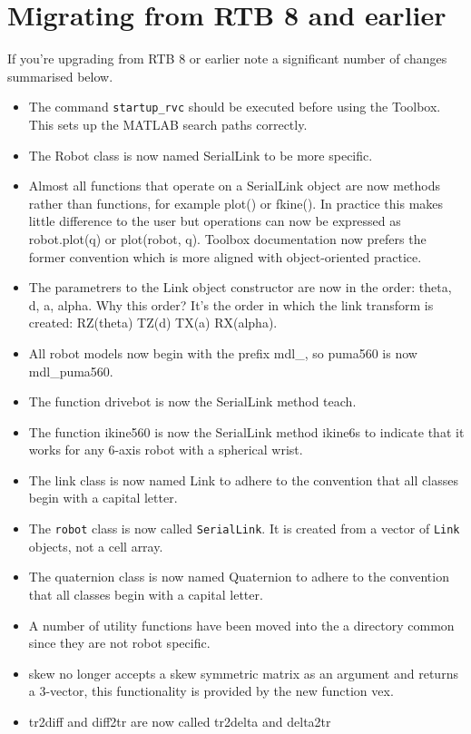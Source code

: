 \documentclass[a4paper]{report}
\begin{document}
\section{Migrating from RTB 8 and earlier}
If you're upgrading from RTB 8 or earlier note a significant number of changes summarised below.
\begin{itemize}
\item The command \texttt{startup\_rvc} should be executed before using the Toolbox.  This sets up the MATLAB search paths correctly.
\item The Robot class is now named SerialLink to be more specific.
\item Almost all functions that operate on a SerialLink object are now methods rather than functions, for example plot() or fkine(). In practice this makes little difference to the user but operations can now be expressed as robot.plot(q) or plot(robot, q). Toolbox documentation now prefers the former convention which is more aligned with object-oriented practice.
\item The parametrers to the Link object constructor are now in the order: theta, d, a, alpha. Why this order? It's the order in which the link transform is created: RZ(theta) TZ(d) TX(a) RX(alpha).
\item All robot models now begin with the prefix mdl\_, so puma560 is now mdl\_puma560.
\item The function drivebot is now the SerialLink method teach.
\item The function ikine560 is now the SerialLink method ikine6s to indicate that it works for any 6-axis robot with a spherical wrist.
\item The link class is now named Link to adhere to the convention that all classes begin with a capital letter.
\item The \texttt{robot} class is now called \texttt{SerialLink}.  It is created from a vector of \texttt{Link} objects, not a cell array.
\item The quaternion class is now named Quaternion to adhere to the convention that all classes begin with a capital letter.
\item A number of utility functions have been moved into the a directory common since they are not robot specific.
\item skew no longer accepts a skew symmetric matrix as an argument and returns a 3-vector, this functionality is provided by the new function vex.
\item tr2diff and diff2tr are now called tr2delta and delta2tr

\end{itemize}
\end{document}
